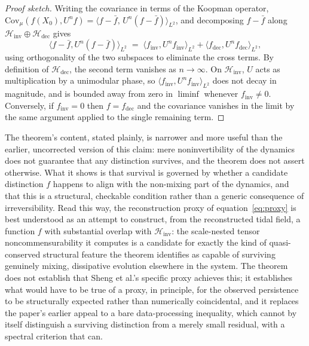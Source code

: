\documentclass[11pt]{article}
\begin{document}
\begin{proof}[Proof sketch]
Writing the covariance in terms of the Koopman operator, $\mathrm{Cov}_\mu(f(X_0), U^n f) = \langle f - \bar f,\, U^n(f - \bar f)\rangle_{L^2}$, and decomposing $f - \bar f$ along $\mathcal H_{\mathrm{inv}} \oplus \mathcal H_{\mathrm{dec}}$ gives
\begin{equation}
\langle f - \bar f, U^n(f - \bar f)\rangle_{L^2} \;=\; \langle f_{\mathrm{inv}}, U^n f_{\mathrm{inv}}\rangle_{L^2} + \langle f_{\mathrm{dec}}, U^n f_{\mathrm{dec}}\rangle_{L^2},
\end{equation}
using orthogonality of the two subspaces to eliminate the cross terms. By definition of $\mathcal H_{\mathrm{dec}}$, the second term vanishes as $n \to \infty$. On $\mathcal H_{\mathrm{inv}}$, $U$ acts as multiplication by a unimodular phase, so $\langle f_{\mathrm{inv}}, U^n f_{\mathrm{inv}}\rangle_{L^2}$ does not decay in magnitude, and is bounded away from zero in $\liminf$ whenever $f_{\mathrm{inv}} \neq 0$. Conversely, if $f_{\mathrm{inv}} = 0$ then $f = f_{\mathrm{dec}}$ and the covariance vanishes in the limit by the same argument applied to the single remaining term.
\end{proof}

The theorem's content, stated plainly, is narrower and more useful than the earlier, uncorrected version of this claim: mere noninvertibility of the dynamics does not guarantee that any distinction survives, and the theorem does not assert otherwise. What it shows is that survival is governed by whether a candidate distinction $f$ happens to align with the non-mixing part of the dynamics, and that this is a structural, checkable condition rather than a generic consequence of irreversibility. Read this way, the reconstruction proxy of equation~\eqref{eq:proxy} is best understood as an attempt to construct, from the reconstructed tidal field, a function $f$ with substantial overlap with $\mathcal H_{\mathrm{inv}}$: the scale-nested tensor noncommensurability it computes is a candidate for exactly the kind of quasi-conserved structural feature the theorem identifies as capable of surviving genuinely mixing, dissipative evolution elsewhere in the system. The theorem does not establish that Sheng et al.'s specific proxy achieves this; it establishes what would have to be true of a proxy, in principle, for the observed persistence to be structurally expected rather than numerically coincidental, and it replaces the paper's earlier appeal to a bare data-processing inequality, which cannot by itself distinguish a surviving distinction from a merely small residual, with a spectral criterion that can.
\end{document}
